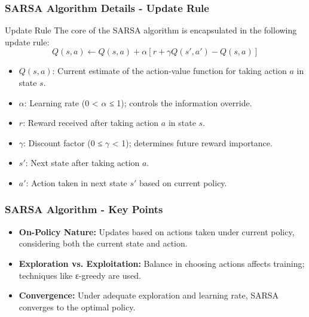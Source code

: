 \documentclass[aspectratio=169]{beamer}
\begin{document}
\begin{frame}[fragile]
    \frametitle{SARSA Algorithm Details - Update Rule}
    \begin{block}{Update Rule}
        The core of the SARSA algorithm is encapsulated in the following update rule:
        \begin{equation}
            Q(s, a) \leftarrow Q(s, a) + \alpha \left[ r + \gamma Q(s', a') - Q(s, a) \right]
        \end{equation}
    \end{block}
    
    \begin{itemize}
        \item \(Q(s, a)\): Current estimate of the action-value function for taking action \(a\) in state \(s\).
        \item \(\alpha\): Learning rate (0 < \(\alpha\) ≤ 1); controls the information override.
        \item \(r\): Reward received after taking action \(a\) in state \(s\).
        \item \(\gamma\): Discount factor (0 ≤ \(\gamma\) < 1); determines future reward importance.
        \item \(s'\): Next state after taking action \(a\).
        \item \(a'\): Action taken in next state \(s'\) based on current policy.
    \end{itemize}
\end{frame}

\begin{frame}[fragile]
    \frametitle{SARSA Algorithm - Key Points}
    \begin{itemize}
        \item \textbf{On-Policy Nature:} Updates based on actions taken under current policy, considering both the current state and action.
        \item \textbf{Exploration vs. Exploitation:} Balance in choosing actions affects training; techniques like ε-greedy are used.
        \item \textbf{Convergence:} Under adequate exploration and learning rate, SARSA converges to the optimal policy.
    \end{itemize}
\end{frame}
\end{document}
